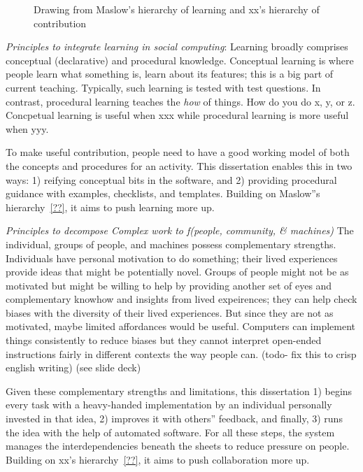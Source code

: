 \begin{figure}[b] 
  \centering
  \caption[]
{Drawing from Maslow's hierarchy of learning and xx's hierarchy of contribution}
  \label{fig:intro-taxonomy}
\end{figure}

\textit{Principles to integrate learning in social computing}: Learning broadly comprises conceptual (declarative) and procedural knowledge. Conceptual learning is where people learn what something is, learn about its features; this is a big part of current teaching. Typically, such learning is tested with test questions. In contrast, procedural learning teaches the {\it how} of things. How do you do x, y, or z.  Concpetual learning is useful when xxx while procedural learning is more useful when yyy.

To make useful contribution, people need to have a good working model of both the concepts and procedures for an activity. This dissertation enables this in two ways: 1) reifying conceptual bits in the software, and 2) providing procedural guidance with examples, checklists, and templates. Building on Maslow''s hierarchy~\ref{??}, it aims to push learning more up.

\textit{Principles to decompose Complex work to f(people, community, \& machines)}
The individual, groups of people, and machines possess complementary strengths. Individuals have personal motivation to do something; their lived experiences provide ideas that might be potentially novel. Groups of people might not be as motivated but might be willing to help by providing another set of eyes and complementary knowhow and insights from lived expeirences; they can help check biases with the diversity of their lived experiences. But since they are not as motivated, maybe limited affordances would be useful. Computers can implement things consistently to reduce biases but they cannot interpret open-ended instructions fairly in different contexts the way people can.  (todo- fix this to crisp english writing) (see slide deck)

Given these complementary strengths and limitations, this dissertation 1) begins every task with a heavy-handed implementation by an individual personally invested in that idea, 2) improves it with others'' feedback, and finally, 3) runs the idea with the help of automated software. For all these steps, the system manages the interdependencies beneath the sheets to reduce pressure on people. Building on xx's hierarchy~\ref{??}, it aims to push collaboration more up.

